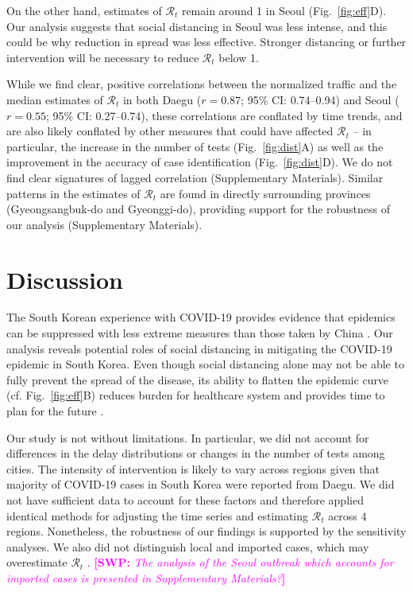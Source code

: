 \documentclass[12pt]{article}
\newcommand{\comment}{\showcomment}
\newcommand{\showcomment}[3]{\textcolor{#1}{\textbf{[#2: }\textsl{#3}\textbf{]}}}
\newcommand{\swp}[1]{\comment{magenta}{SWP}{#1}}
\newcommand{\fref}[1]{Fig.~\ref{fig:#1}}
\begin{document}
On the other hand, estimates of $\mathcal R_t$ remain around 1 in Seoul (\fref{eff}D).
Our analysis suggests that social distancing in Seoul was less intense, and this could be why reduction in spread was less effective.
Stronger distancing or further intervention will be necessary to reduce $\mathcal R_t$ below 1.

While we find clear, positive correlations between the normalized traffic and the median estimates of $\mathcal R_t$ in both Daegu ($r=0.87$; 95\% CI: 0.74--0.94) and Seoul ($r=0.55$; 95\% CI: 0.27--0.74), these correlations are conflated by time trends, and are also likely conflated by other measures that could have affected $\mathcal R_t$ --
in particular, the increase in the number of tests (\fref{dist}A) as well as the improvement in the accuracy of case identification (\fref{dist}D).
We do not find clear signatures of lagged correlation (Supplementary Materials).
Similar patterns in the estimates of $\mathcal R_t$ are found in directly surrounding provinces (Gyeongsangbuk-do and Gyeonggi-do), providing support for the robustness of our analysis (Supplementary Materials).

\section{Discussion}

The South Korean experience with COVID-19 provides evidence that epidemics can be suppressed with less extreme measures than those taken by China \citep{kickbusch2020response}.
Our analysis reveals potential roles of social distancing in mitigating the COVID-19 epidemic in South Korea.
Even though social distancing alone may not be able to fully prevent the spread of the disease, its ability to flatten the epidemic curve (cf. \fref{eff}B) reduces burden for healthcare system and provides time to plan for the future \citep{anderson2020will}.

Our study is not without limitations.
In particular, we did not account for differences in the delay distributions or changes in the number of tests among cities.
The intensity of intervention is likely to vary across regions given that majority of COVID-19 cases in South Korea were reported from Daegu.
We did not have sufficient data to account for these factors and therefore applied identical methods for adjusting the time series and estimating $\mathcal R_t$ across 4 regions.
Nonetheless, the robustness of our findings is supported by the sensitivity analyses.
We also did not distinguish local and imported cases, which may overestimate $\mathcal R_t$ \citep{thompson2019improved}. \swp{The analysis of the Seoul outbreak which accounts for imported cases is presented in Supplementary Materials?}
\end{document}
